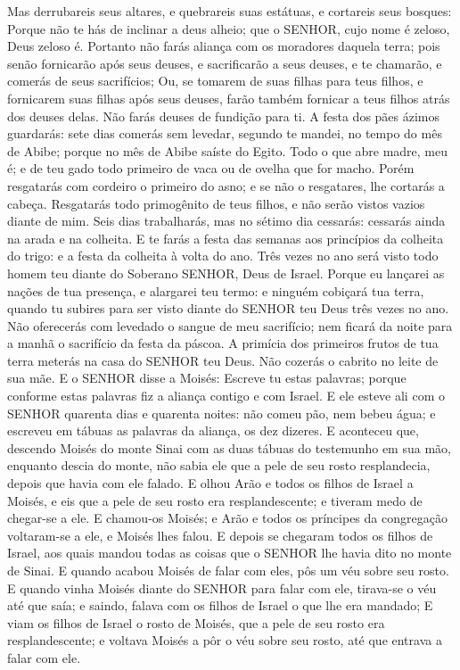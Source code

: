 {Mas derrubareis seus altares, e quebrareis suas estátuas, e cortareis seus bosques:
Porque não te hás de inclinar a deus alheio; que o SENHOR, cujo nome é zeloso, Deus zeloso é.
Portanto não farás aliança com os moradores daquela terra; pois senão fornicarão após seus deuses, e sacrificarão a seus deuses, e te chamarão, e comerás de seus sacrifícios;
Ou, se tomarem de suas filhas para teus filhos, e fornicarem suas filhas após seus deuses, farão também fornicar a teus filhos atrás dos deuses delas.
Não farás deuses de fundição para ti.
A festa dos pães ázimos guardarás: sete dias comerás sem levedar, segundo te mandei, no tempo do mês de Abibe; porque no mês de Abibe saíste do Egito.
Todo o que abre madre, meu é; e de teu gado todo primeiro de vaca ou de ovelha que for macho.
Porém resgatarás com cordeiro o primeiro do asno; e se não o resgatares, lhe cortarás a cabeça. Resgatarás todo primogênito de teus filhos, e não serão vistos vazios diante de mim.
Seis dias trabalharás, mas no sétimo dia cessarás: cessarás ainda na arada e na colheita.
E te farás a festa das semanas aos princípios da colheita do trigo: e a festa da colheita à volta do ano.
Três vezes no ano será visto todo homem teu diante do Soberano SENHOR, Deus de Israel.
Porque eu lançarei as nações de tua presença, e alargarei teu termo: e ninguém cobiçará tua terra, quando tu subires para ser visto diante do SENHOR teu Deus três vezes no ano.
Não oferecerás com levedado o sangue de meu sacrifício; nem ficará da noite para a manhã o sacrifício da festa da páscoa.
A primícia dos primeiros frutos de tua terra meterás na casa do SENHOR teu Deus. Não cozerás o cabrito no leite de sua mãe.
E o SENHOR disse a Moisés: Escreve tu estas palavras; porque conforme estas palavras fiz a aliança contigo e com Israel.
E ele esteve ali com o SENHOR quarenta dias e quarenta noites: não comeu pão, nem bebeu água; e escreveu em tábuas as palavras da aliança, os dez dizeres.
E aconteceu que, descendo Moisés do monte Sinai com as duas tábuas do testemunho em sua mão, enquanto descia do monte, não sabia ele que a pele de seu rosto resplandecia, depois que havia com ele falado.
E olhou Arão e todos os filhos de Israel a Moisés, e eis que a pele de seu rosto era resplandescente; e tiveram medo de chegar-se a ele.
E chamou-os Moisés; e Arão e todos os príncipes da congregação voltaram-se a ele, e Moisés lhes falou.
E depois se chegaram todos os filhos de Israel, aos quais mandou todas as coisas que o SENHOR lhe havia dito no monte de Sinai.
E quando acabou Moisés de falar com eles, pôs um véu sobre seu rosto.
E quando vinha Moisés diante do SENHOR para falar com ele, tirava-se o véu até que saía; e saindo, falava com os filhos de Israel o que lhe era mandado;
E viam os filhos de Israel o rosto de Moisés, que a pele de seu rosto era resplandescente; e voltava Moisés a pôr o véu sobre seu rosto, até que entrava a falar com ele.

}
